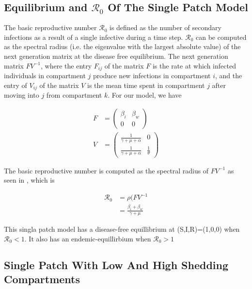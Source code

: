 \documentclass[12pt]{article}\usepackage[]{graphicx}\usepackage[]{color}
\begin{document}
\subsection{Equilibrium and {$\mathcal R_0$} Of The Single Patch Model}

The basic reproductive number ${\mathcal R_0}$ is defined as the number of secondary infections as a result of a single infective during a time step.
${\mathcal R_0}$ can be computed as the spectral radius (i.e. the eigenvalue with the largest absolute value) of the next generation matrix at the disease free equilibrium.
The next generation matrix $FV^{−1}$, where the entry $F_{ij}$ of the matrix $F$ is the rate at which infected individuals in compartment $j$ produce new infections in compartment $i$, and the entry of $V_{ij}$ of the matrix $V$ is the mean time spent in compartment $j$ after moving into $j$ from compartment $k$.
For our model, we have
\begin{linenomath}
\begin{align*}
		F&=\begin{pmatrix}
			\beta_i & \beta_w\\
			0 & 0
			\end{pmatrix}\\
		V&=\begin{pmatrix}
			\frac{1}{\gamma+\mu+\alpha} & 0\\
			\frac{1}{\gamma+\mu+\alpha} &\frac{1}{\theta}
			\end{pmatrix}
\end{align*}
\end{linenomath}
The basic reproductive number is computed as the spectral radius of $FV^{-1}$ as seen in \cite{link9}, which is
\begin{linenomath}
\begin{align*}
    {\mathcal R_0} &= \rho(FV^{-1}\\
		           &=\frac{\beta_i+\beta_w}{\gamma+\mu}
\end{align*}
\end{linenomath}
This singla patch model has a disease-free equillibrium at (S,I,R)=(1,0,0) when ${\mathcal R_0}<1$.
It also has an endemic-equillirbium when ${\mathcal R_0}>1$

\subsection{Single Patch With Low And High Shedding Compartments}
\end{document}
